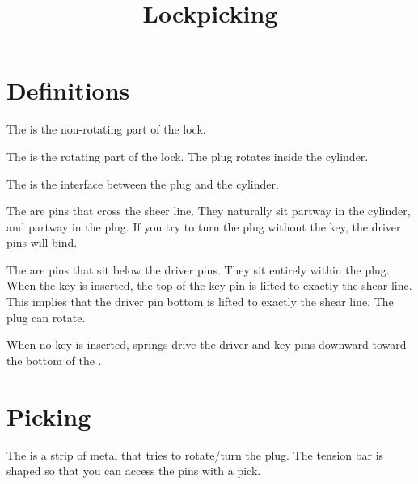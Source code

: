 \documentclass[11pt, oneside]{amsart}
\begin{document}
\title{Lockpicking}
\maketitle

\section{Definitions}

\begin{definition}
  The  is the non-rotating part of the lock.
\end{definition}

\begin{definition}
  The  is the rotating part of the lock. The plug rotates
  inside the cylinder.
\end{definition}

\begin{definition}
  The  is the interface between the plug and the
  cylinder.
\end{definition}

\begin{definition}
  The  are pins that cross the sheer line. They
  naturally sit partway in the cylinder, and partway in the plug. If you
  try to turn the plug without the key, the driver pins will bind.
\end{definition}

\begin{definition}
  The  are pins that sit below the driver pins. They
  sit entirely within the plug. When the key is inserted, the top of the
  key pin is lifted to exactly the shear line. This implies that the
  driver pin bottom is lifted to exactly the shear line. The plug can
  rotate.
\end{definition}

\begin{remark}
  When no key is inserted, springs drive the driver and key pins
  downward toward the bottom of the .
\end{remark}

\section{Picking}

\begin{definition}
  The  is a strip of metal that tries to rotate/turn
  the plug. The tension bar is shaped so that you can access the pins
  with a pick.
\end{definition}
\end{document}
